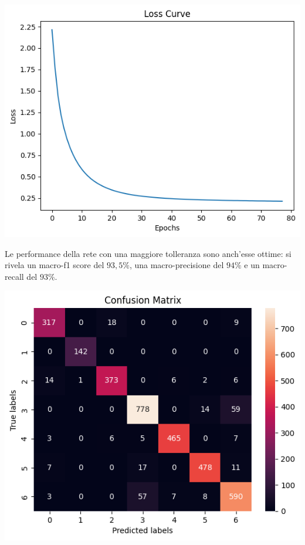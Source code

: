 \begin{Figure}
    \centering
    \includegraphics[width=0.9\linewidth]{img/mlp_high_loss.png}
\end{Figure}

Le performance della rete con una maggiore tolleranza sono anch'esse ottime:
si rivela un macro-f1 score del $93,5\%$, 
una macro-precisione del $94\%$ e un macro-recall del $93\%$.
\begin{Figure}
    \centering
    \includegraphics[width=\linewidth]{img/mlp_high_confusion_matrix.png}
\end{Figure}

